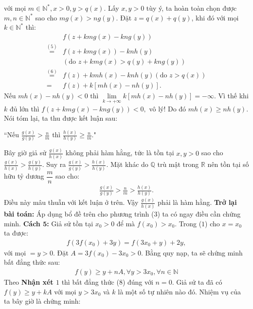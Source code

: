 \begin{multicols}{2}
	với mọi $m \in \mathbb{N^*},x > 0,y > q(x)$.
	\vskip 0.1cm 
	Lấy $x, y > 0$  tùy ý, ta hoàn toàn chọn được $m,n \in \mathbb{N^*}$  sao cho $mg(x) > ng(y)$. Đặt  $z = q(x) + q(y)$, khi đó với mọi $k \in \mathbb{N^*}$  thì: 
	\begin{align*}
		&f(z + kmg(x) - kng(y))\\
		\mathop  = \limits^{(5)} &f(z + kmg(x)) - knh(y)\\
		&(\text{do } z + kmg(x) > q(y) + kng(y))\\
		\mathop  = \limits^{(6)} &f(z) + kmh(x) - knh(y) (\text{do } z > q(x))\\
		= &f(z) + k[mh(x) - nh(y)].
	\end{align*}
	Nếu $mh(x) - nh(y) < 0$  thì $\mathop {\lim }\limits_{k \to  + \infty } k[mh(x) - nh(y)] =  - \infty$. Vì thế khi  $k$ đủ lớn thì $f(z + kmg(x) - kng(y)) < 0,$
	vô lý! Do đó  $mh(x) \ge nh(y)$.
	\vskip 0.1cm
	Nói tóm lại, ta thu được kết luận sau: 
	\vskip 0.1cm
	\centerline{``Nếu  $\frac{{g(x)}}{{g(y)}} > \frac{n}{m}$ thì  $\frac{{h(x)}}{{h(y)}} \ge \frac{n}{m}$."}
	\vskip 0.1cm
	Bây giờ giả sử $\frac{{g(x)}}{{h(x)}}$  không phải hàm hằng, tức là tồn tại $x,y > 0$  sao cho $\frac{{g(x)}}{{h(x)}} > \frac{{g(y)}}{{h(y)}}$. Suy ra  $\frac{{g(x)}}{{g(y)}} > \frac{{h(x)}}{{h(y)}}.$
	\vskip 0.1cm
	Mặt khác do $\mathbb{Q}$ trù mật trong  $\mathbb{R}$ nên tồn tại số hữu tỷ dương  $\dfrac{m}{n}$ sao cho: 
	\begin{align*}
		\frac{{g(x)}}{{g(y)}} > \frac{n}{m} > \frac{{h(x)}}{{h(y)}}.
	\end{align*}
	Điều này mâu thuẫn với kết luận ở trên. Vậy  $\frac{{g(x)}}{{h(x)}}$  phải là hàm hằng.
	\vskip 0.1cm
	\textbf{\color{hoccungpi}Trở lại bài toán:} Áp dụng bổ đề trên cho phương trình ($3$) ta có ngay điều cần chứng minh.
	\vskip 0.1cm
	\textbf{\color{hoccungpi}Cách $\pmb5$:} 
	\vskip 0.1cm    
	Giả sử tồn tại $x_0 > 0$  để mà $f({x_0}) > {x_0}.$  Trong ($1$) cho $x = {x_0}$  ta được: 
	\begin{align*}
		f(3f({x_0}) + 3y)
		= f(3{x_0} + y) + 2y, \tag{$7$}
	\end{align*}
	với mọi $=y > 0.$
	\vskip 0.1cm
	Đặt $A = 3f\left(x_0\right) - 3{x_0} > 0$.  Bằng quy nạp, ta sẽ chứng minh bất đẳng thức sau: 
	\begin{align*}
		f(y) \ge y + nA,\forall y > 3{x_0},\forall n \in \mathbb{N}
	\end{align*}
	Theo \textbf{\color{hoccungpi}Nhận xét $1$} thì bất đẳng thức ($8$) đúng với  $n = 0$. Giả sử ta đã có $f(y) \ge y + kA$ với mọi $y > 3x_0$ và  $k$ là một số tự nhiên nào đó. Nhiệm vụ của ta bây giờ là chứng minh: 

\end{multicols}
